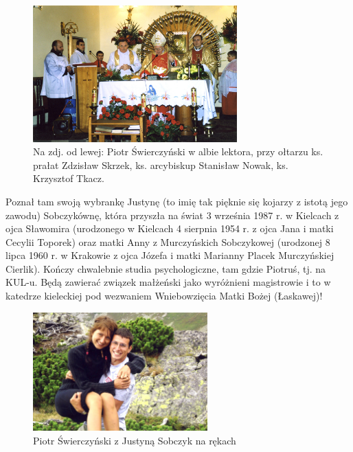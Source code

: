 \begin{figure}[!h]
\begin{center}
\includegraphics[width=0.7\textwidth]{photo/piotr_swierczynski_2.jpg}
\caption[Piotr Świerczyński w służbie ołtarza]{Na zdj. od lewej: Piotr Świerczyński w albie lektora, przy ołtarzu ks. prałat Zdzisław Skrzek, ks. arcybiskup Stanisław Nowak, ks. Krzysztof Tkacz.}
\end{center}
\end{figure}

Poznał tam swoją wybrankę Justynę (to imię tak pięknie się kojarzy z istotą jego zawodu) Sobczykównę, która przyszła na świat 3 września 1987 r. w Kielcach z ojca Sławomira (urodzonego w Kielcach 4 sierpnia 1954 r. z ojca Jana i matki Cecylii Toporek) oraz matki Anny z Murczyńskich Sobczykowej (urodzonej 8 lipca 1960 r. w Krakowie z ojca Józefa i matki Marianny Placek Murczyńskiej Cierlik). Kończy chwalebnie studia psychologiczne, tam gdzie Piotruś, tj. na KUL-u. Będą zawierać związek małżeński jako wyróżnieni magistrowie i to w katedrze kieleckiej pod wezwaniem Wniebowzięcia Matki Bożej (Łaskawej)!
\begin{figure}[!h]
\begin{center}
\includegraphics[width=0.6\textwidth]{photo/piotr_swierczynski_justyna_sobczyk.jpg}
\caption{Piotr Świerczyński z Justyną Sobczyk na rękach}
\end{center}
\end{figure}

